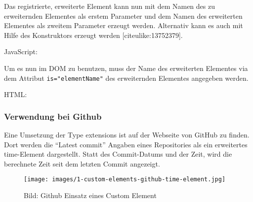 Das registrierte, erweiterte Element kann nun mit dem Namen des zu
erweiternden Elementes als erstem Parameter und dem Namen des
erweiterten Elementes als zweitem Parameter erzeugt werden. Alternativ
kann es auch mit Hilfe des Konstruktors erzeugt werden
{[}citeulike:13752379{]}.

JavaScript:

\begin{Shaded}
\begin{Highlighting}[]
 \OperatorTok{=} \NormalTok{(}\OperatorTok{,} \NormalTok{)}\OperatorTok{;}

 \OperatorTok{=}  \NormalTok{()}\OperatorTok{;}
\end{Highlighting}
\end{Shaded}

Um es nun im DOM zu benutzen, muss der Name des erweiterten Elementes
via dem Attribut \texttt{is="elementName"} des erweiternden Elementes
angegeben werden.

HTML:

\begin{Shaded}
\begin{Highlighting}[]
  \KeywordTok{>}
\end{Highlighting}
\end{Shaded}

\subsubsection{Verwendung bei Github}\label{verwendung-bei-github}

Eine Umsetzung der Type extensions ist auf der Webseite von GitHub zu
finden. Dort werden die ``Latest commit'' Angaben eines Repositories als
ein erweitertes time-Element dargestellt. Statt des Commit-Datums und
der Zeit, wird die berechnete Zeit seit dem letzten Commit angezeigt.

\begin{figure}[htbp]
\centering
\texttt{[image: images/1-custom-elements-github-time-element.jpg]}
\caption{Bild: Github Einsatz eines Custom Element}
\end{figure}

